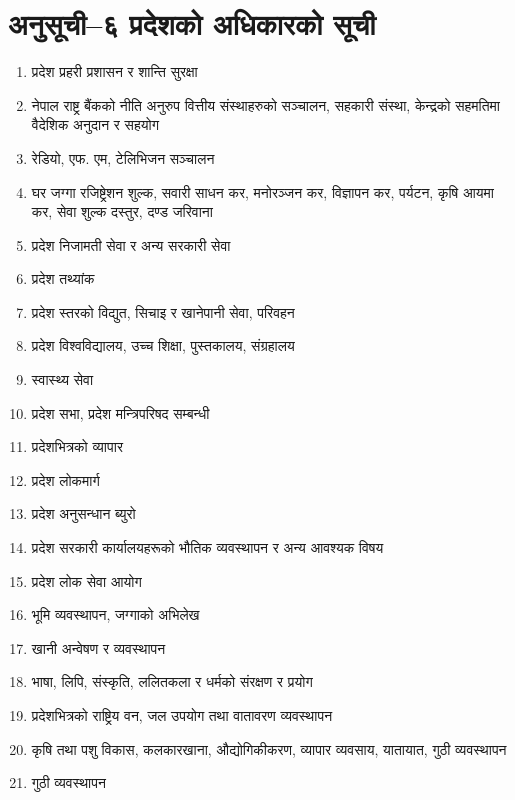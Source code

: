 \section{अनुसूची–६ प्रदेशको अधिकारको सूची}

\begin{enumerate}
\item प्रदेश प्रहरी प्रशासन र शान्ति सुरक्षा
\item नेपाल राष्ट्र बैंकको नीति अनुरुप वित्तीय संस्थाहरुको सञ्चालन, सहकारी संस्था, केन्द्रको सहमतिमा वैदेशिक अनुदान र सहयोग
\item रेडियो, एफ. एम, टेलिभिजन सञ्चालन
\item घर जग्गा रजिष्ट्रेशन शुल्क, सवारी साधन कर, मनोरञ्जन कर, विज्ञापन कर, पर्यटन, कृषि आयमा कर, सेवा शुल्क दस्तुर, दण्ड जरिवाना
\item प्रदेश निजामती सेवा र अन्य सरकारी सेवा
\item प्रदेश तथ्यांक
\item प्रदेश स्तरको विद्युत, सिचाइ र खानेपानी सेवा, परिवहन
\item प्रदेश विश्वविद्यालय, उच्च शिक्षा, पुस्तकालय, संग्रहालय
\item स्वास्थ्य सेवा
\item प्रदेश सभा, प्रदेश मन्त्रिपरिषद सम्बन्धी
\item प्रदेशभित्रको व्यापार
\item प्रदेश लोकमार्ग
\item प्रदेश अनुसन्धान ब्युरो
\item प्रदेश सरकारी कार्यालयहरूको भौतिक व्यवस्थापन र अन्य आवश्यक विषय
\item प्रदेश लोक सेवा आयोग
\item भूमि व्यवस्थापन, जग्गाको अभिलेख
\item खानी अन्वेषण र व्यवस्थापन
\item भाषा, लिपि, संस्कृति, ललितकला र धर्मको संरक्षण र प्रयोग
\item प्रदेशभित्रको राष्ट्रिय वन, जल उपयोग तथा वातावरण व्यवस्थापन
\item कृषि तथा पशु विकास, कलकारखाना, औद्योगिकीकरण, व्यापार व्यवसाय, यातायात, गुठी व्यवस्थापन
\item गुठी व्यवस्थापन
\end{enumerate}